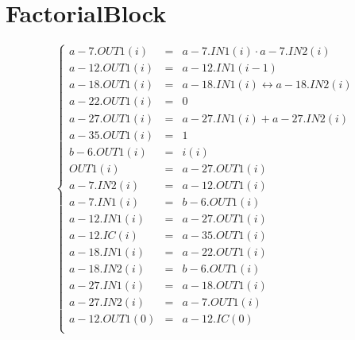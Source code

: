 \documentclass{article}
\begin{document}
\section{FactorialBlock}
$$
\left\{\begin{array}{lcl}
	a-7.OUT1(i) &=& a-7.IN1\left(i\right) \cdot  a-7.IN2\left(i\right)\\
	a-12.OUT1(i) &=& a-12.IN1\left(i-1\right)\\
	a-18.OUT1(i) &=& a-18.IN1\left(i\right) \leftrightarrow  a-18.IN2\left(i\right)\\
	a-22.OUT1(i) &=& 0\\
	a-27.OUT1(i) &=& a-27.IN1\left(i\right) + a-27.IN2\left(i\right)\\
	a-35.OUT1(i) &=& 1\\
	b-6.OUT1(i) &=& i\left(i\right)\\
	OUT1(i) &=& a-27.OUT1\left(i\right)\\
	a-7.IN2(i) &=& a-12.OUT1\left(i\right)\\
	a-7.IN1(i) &=& b-6.OUT1\left(i\right)\\
	a-12.IN1(i) &=& a-27.OUT1\left(i\right)\\
	a-12.IC(i) &=& a-35.OUT1\left(i\right)\\
	a-18.IN1(i) &=& a-22.OUT1\left(i\right)\\
	a-18.IN2(i) &=& b-6.OUT1\left(i\right)\\
	a-27.IN1(i) &=& a-18.OUT1\left(i\right)\\
	a-27.IN2(i) &=& a-7.OUT1\left(i\right)\\
	a-12.OUT1(0) &=& a-12.IC(0)\\
\end{array}\right.
$$
\end{document}

